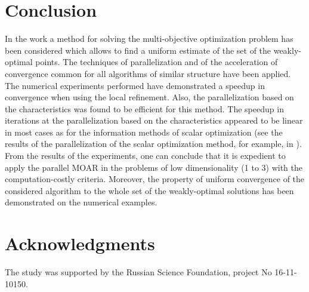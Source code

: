 \documentclass{llncs}
\begin{document}
\section{Conclusion}
In the work a method for solving the multi-objective optimization problem has been considered which allows to
find a uniform estimate of the set of the weakly-optimal points.
The techniques of parallelization and of the acceleration of convergence common for all algorithms
of similar structure have been applied. The numerical experiments performed have
demonstrated a speedup in convergence when using the local refinement. Also, the
parallelization based on the characteristics was found to be efficient for this method. The
speedup in iterations at the parallelization based on the characteristics appeared to be linear in
most cases as for the information methods of scalar optimization (see the results of the
parallelization of the scalar optimization method, for example, in
\cite{barkalovLebedef2016}). From the results of the experiments, one can conclude that it is
expedient to apply the parallel MOAR in the problems of low dimensionality (1 to 3) with
the computation-costly criteria. Moreover, the property of uniform convergence of the considered
algorithm to the whole set of the weakly-optimal solutions has been demonstrated on the
numerical examples.

\section*{Acknowledgments}
The study was supported by the Russian Science Foundation, project No 16-11-10150.
%
%



\clearpage
{} %
\renewcommand{\indexname}{Author Index}
\printindex
\clearpage
\end{document}
